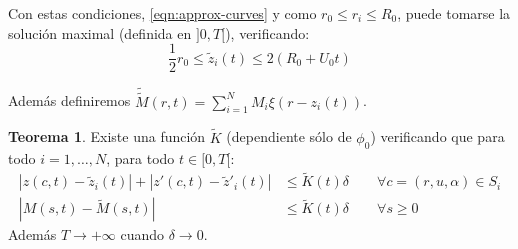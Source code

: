 \documentclass[a4paper,10pt]{scrartcl}
\theoremstyle{definition}
\newtheorem{theorem}{Teorema}
\newcommand{\ktilde}{\widetilde{K}}
\newcommand{\dtilde}[1]{\widetilde{\widetilde{#1}}}
\numberwithin{equation}{section}
\begin{document}
Con estas condiciones, \eqref{eqn:approx-curves} y como $r_0 \le r_i \le R_0$, puede tomarse la solución maximal (definida en $]0,T[$), verificando:
\begin{equation}
    \frac{1}{2}r_0 \le \widetilde{z}_i(t) \le 2(R_0 + U_0t)
\label{eqn:barzbounds}
\end{equation}

Además definiremos $\dtilde{M}(r,t) = \sum_{i=1}^N M_i \xi(r-z_i(t))$.
\begin{theorem}
 Existe una función $\widetilde{K}$ (dependiente sólo de $\phi_0$) verificando que para todo $i = 1, \ldots, N$, para todo $t\in [0,T[$:
 \begin{align*}
  |z(c,t) - \widetilde{z}_i(t)| + |z'(c,t) - \widetilde{z}'_i(t)| &\le \ktilde(t) \delta \qquad \forall c= (r,u,\alpha) \in S_i \\
  |M(s,t) - \widetilde{M}(s,t)| &\le \ktilde(t)\delta \qquad \forall s \ge 0
 \end{align*}
 Además $T \rightarrow + \infty$ cuando $\delta \rightarrow 0$.
 \label{th:fundamental}
\end{theorem}
\end{document}
